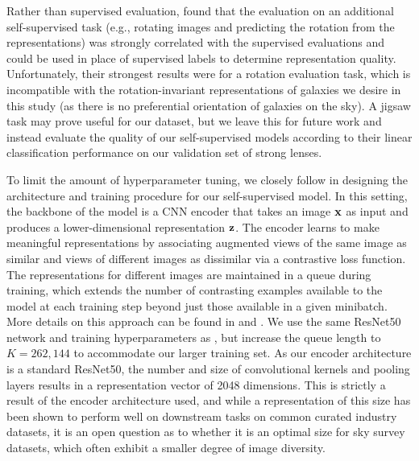 \documentclass{aastex631}
\begin{document}
Rather than supervised evaluation, \citet{ssl_representation_quality} found that the evaluation on an additional self-supervised task (e.g., rotating images and predicting the rotation from the representations) was strongly correlated with the supervised evaluations and could be used in place of supervised labels to determine representation quality. Unfortunately, their strongest results were for a rotation evaluation task, which is incompatible with the rotation-invariant representations of galaxies we desire in this study (as there is no preferential orientation of galaxies on the sky). A jigsaw task \citep{ssl_jigsaw} may prove useful for our dataset, but we leave this for future work and instead evaluate the quality of our self-supervised models according to their linear classification performance on our validation set of strong lenses.

To limit the amount of hyperparameter tuning, we closely follow \cite{Hayat_2021} in designing the architecture and training procedure for our self-supervised model. In this setting, the backbone of the model is a CNN encoder that takes an image $\bf{x}$ as input and produces a lower-dimensional representation $\bf{z}$. The encoder learns to make meaningful representations by associating augmented views of the same image as similar and views of different images as dissimilar via a contrastive loss function. The representations for different images are maintained in a queue during training, which extends the number of contrasting examples available to the model at each training step beyond just those available in a given minibatch. More details on this approach can be found in \cite{Hayat_2021} and \cite{chen2020improved}. We use the same ResNet50 network and training hyperparameters as \cite{Hayat_2021}, but increase the queue length to $K=262,144$ to accommodate our larger training set. As our encoder architecture is a standard ResNet50, the number and size of convolutional kernels and pooling layers results in a representation vector of 2048 dimensions. This is strictly a result of the encoder architecture used, and while a representation of this size has been shown to perform well on downstream tasks on common curated industry datasets, it is an open question as to whether it is an optimal size for sky survey datasets, which often exhibit a smaller degree of image diversity.
\end{document}
